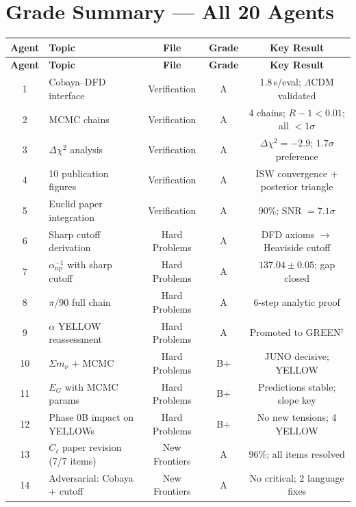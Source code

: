 \documentclass[11pt,a4paper]{article}
\begin{document}
\section{Grade Summary --- All 20 Agents}
\label{sec:grades}

\begin{center}
\begin{longtable}{clccc}
\toprule
\textbf{Agent} & \textbf{Topic} & \textbf{File} & \textbf{Grade} & \textbf{Key Result} \\
\midrule
\endfirsthead
\toprule
\textbf{Agent} & \textbf{Topic} & \textbf{File} & \textbf{Grade} & \textbf{Key Result} \\
\midrule
\endhead
1 & Cobaya--DFD interface & Verification & A & 1.8\,s/eval; $\Lambda$CDM validated \\
2 & MCMC chains & Verification & A & 4 chains; $R-1 < 0.01$; all $< 1\sigma$ \\
3 & $\Delta\chi^2$ analysis & Verification & A & $\Delta\chi^2 = -2.9$; $1.7\sigma$ preference \\
4 & 10 publication figures & Verification & A & ISW convergence + posterior triangle \\
5 & Euclid paper integration & Verification & A & 90\%; SNR $= 7.1\sigma$ \\
\midrule
6 & Sharp cutoff derivation & Hard Problems & A & DFD axioms $\to$ Heaviside cutoff \\
7 & $\alpha^{-1}_{\mathrm{np}}$ with sharp cutoff & Hard Problems & A & $137.04 \pm 0.05$; gap closed \\
8 & $\pi/90$ full chain & Hard Problems & A & 6-step analytic proof \\
9 & $\alpha$ YELLOW reassessment & Hard Problems & A & Promoted to GREEN$^\dagger$ \\
10 & $\Sigma m_\nu$ + MCMC & Hard Problems & B+ & JUNO decisive; YELLOW \\
11 & $E_G$ with MCMC params & Hard Problems & B+ & Predictions stable; slope key \\
12 & Phase 0B impact on YELLOWs & Hard Problems & B+ & No new tensions; 4 YELLOW \\
\midrule
13 & $C_\ell$ paper revision (7/7 items) & New Frontiers & A & 96\%; all items resolved \\
14 & Adversarial: Cobaya + cutoff & New Frontiers & A & No critical; 2 language fixes \\

\end{longtable}
\end{center}
\end{document}
